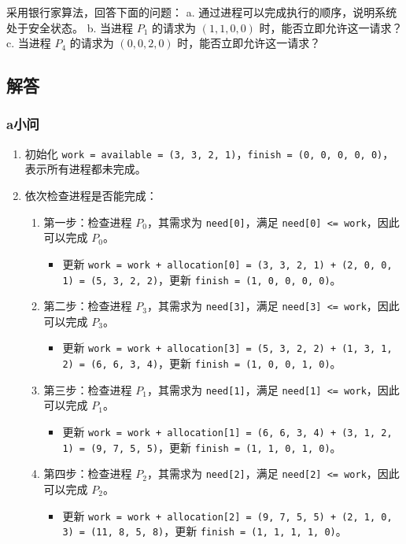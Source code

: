 \documentclass{article}
\begin{document}
采用银行家算法，回答下面的问题：
a. 通过进程可以完成执行的顺序，说明系统处于安全状态。
b. 当进程 $P_1$ 的请求为 $(1, 1, 0, 0)$ 时，能否立即允许这一请求？
c. 当进程 $P_4$ 的请求为 $(0, 0, 2, 0)$ 时，能否立即允许这一请求？

\subsection{解答}

\subsubsection{a小问}

\begin{enumerate}
	\item 初始化 \texttt{work = available = (3, 3, 2, 1)}，\texttt{finish = (0, 0, 0, 0, 0)}，表示所有进程都未完成。
	
	\item 依次检查进程是否能完成：
	
	\begin{enumerate}
		\item 第一步：检查进程 $P_0$，其需求为 \texttt{need[0]}，满足 \texttt{need[0] <= work}，因此可以完成 $P_0$。
		\begin{itemize}
			\item 更新 \texttt{work = work + allocation[0] = (3, 3, 2, 1) + (2, 0, 0, 1) = (5, 3, 2, 2)}，更新 \texttt{finish = (1, 0, 0, 0, 0)}。
		\end{itemize}
		
		\item 第二步：检查进程 $P_3$，其需求为 \texttt{need[3]}，满足 \texttt{need[3] <= work}，因此可以完成 $P_3$。
		\begin{itemize}
			\item 更新 \texttt{work = work + allocation[3] = (5, 3, 2, 2) + (1, 3, 1, 2) = (6, 6, 3, 4)}，更新 \texttt{finish = (1, 0, 0, 1, 0)}。
		\end{itemize}
		
		\item 第三步：检查进程 $P_1$，其需求为 \texttt{need[1]}，满足 \texttt{need[1] <= work}，因此可以完成 $P_1$。
		\begin{itemize}
			\item 更新 \texttt{work = work + allocation[1] = (6, 6, 3, 4) + (3, 1, 2, 1) = (9, 7, 5, 5)}，更新 \texttt{finish = (1, 1, 0, 1, 0)}。
		\end{itemize}
		
		\item 第四步：检查进程 $P_2$，其需求为 \texttt{need[2]}，满足 \texttt{need[2] <= work}，因此可以完成 $P_2$。
		\begin{itemize}
			\item 更新 \texttt{work = work + allocation[2] = (9, 7, 5, 5) + (2, 1, 0, 3) = (11, 8, 5, 8)}，更新 \texttt{finish = (1, 1, 1, 1, 0)}。
		\end{itemize}
		

\end{enumerate}
\end{enumerate}
\end{document}
